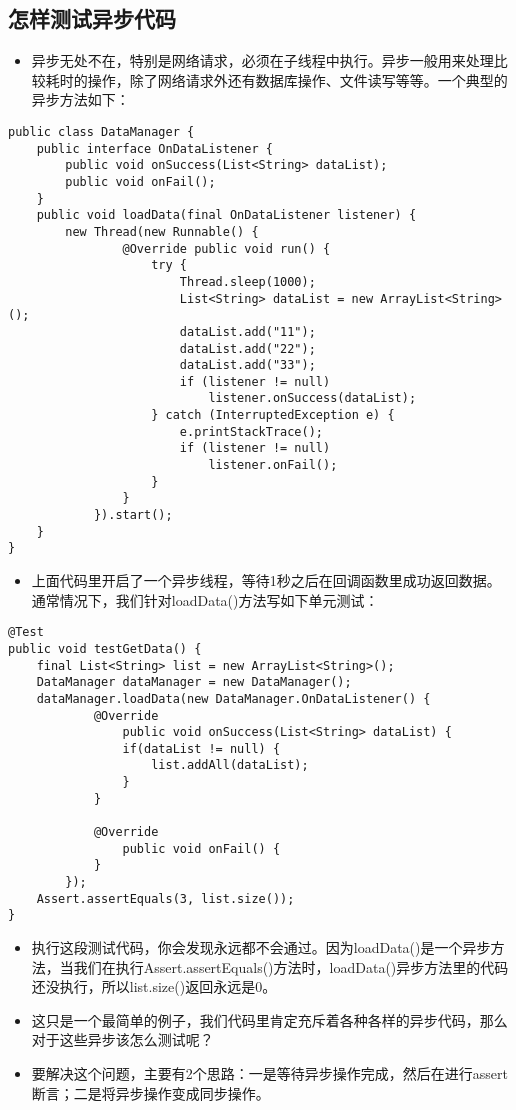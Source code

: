 \documentclass[9pt, b5paper]{article}
\begin{document}
\subsection{怎样测试异步代码}
\label{sec-1-3}
\begin{itemize}
\item 异步无处不在，特别是网络请求，必须在子线程中执行。异步一般用来处理比较耗时的操作，除了网络请求外还有数据库操作、文件读写等等。一个典型的异步方法如下：
\end{itemize}
\begin{verbatim}
public class DataManager {
    public interface OnDataListener {
        public void onSuccess(List<String> dataList);
        public void onFail();
    }
    public void loadData(final OnDataListener listener) {
        new Thread(new Runnable() {
                @Override public void run() {
                    try {
                        Thread.sleep(1000);
                        List<String> dataList = new ArrayList<String>();
                        dataList.add("11");
                        dataList.add("22");
                        dataList.add("33");
                        if (listener != null) 
                            listener.onSuccess(dataList);
                    } catch (InterruptedException e) {
                        e.printStackTrace();
                        if (listener != null) 
                            listener.onFail();
                    }
                }
            }).start();
    }
}
\end{verbatim}
\begin{itemize}
\item 上面代码里开启了一个异步线程，等待1秒之后在回调函数里成功返回数据。通常情况下，我们针对loadData()方法写如下单元测试：
\end{itemize}
\begin{verbatim}
@Test
public void testGetData() {
    final List<String> list = new ArrayList<String>();
    DataManager dataManager = new DataManager();
    dataManager.loadData(new DataManager.OnDataListener() {
            @Override
                public void onSuccess(List<String> dataList) {
                if(dataList != null) {
                    list.addAll(dataList);
                }
            }

            @Override
                public void onFail() {
            }
        });
    Assert.assertEquals(3, list.size());
}
\end{verbatim}
\begin{itemize}
\item 执行这段测试代码，你会发现永远都不会通过。因为loadData()是一个异步方法，当我们在执行Assert.assertEquals()方法时，loadData()异步方法里的代码还没执行，所以list.size()返回永远是0。
\item 这只是一个最简单的例子，我们代码里肯定充斥着各种各样的异步代码，那么对于这些异步该怎么测试呢？
\item 要解决这个问题，主要有2个思路：一是等待异步操作完成，然后在进行assert断言；二是将异步操作变成同步操作。
\end{itemize}
\end{document}
